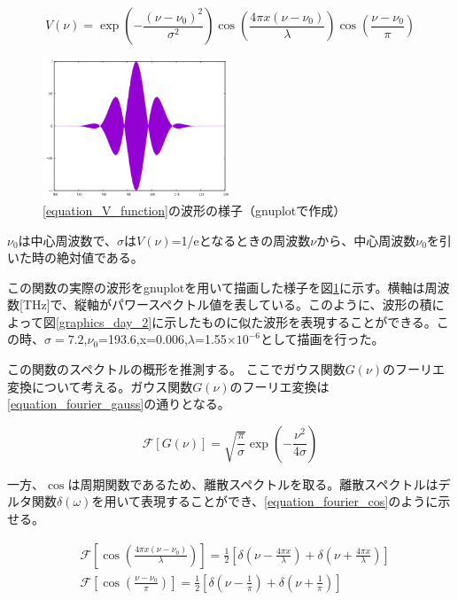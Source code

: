 \documentclass[uplatex, titlepage, fontsize=10pt, paper=a4paper]{jsarticle}
\numberwithin{equation}{section}
\begin{document}
\begin{equation}
    V(\nu)=\exp\left(-\frac{(\nu-\nu_{0})^2}{\sigma^2}\right) \cos\left(\frac{4{\pi}x{(\nu-\nu_{0})}}{\lambda}\right)\cos\left(\frac{\nu-\nu_{0}}{\pi}\right)
    \label{equation_V_function}
\end{equation}

\begin{figure}
    \includegraphics[width = 0.5\textwidth]{画像フォルダ/spector_sample.png}
    \caption{\eqref{equation_V_function}の波形の様子（gnuplotで作成）}
    \label{function_V_sample_wave}
\end{figure}

$\nu_{0}$は中心周波数で、$\sigma$は$V(\nu)$=1/eとなるときの周波数$\nu$から、中心周波数$\nu_0$を引いた時の絶対値である。

この関数の実際の波形をgnuplotを用いて描画した様子を図\ref{function_V_sample_wave}に示す。横軸は周波数[THz]で、縦軸がパワースペクトル値を表している。このように、波形の積によって図\ref{graphics_day_2}に示したものに似た波形を表現することができる。この時、$\sigma=7.2$,$\nu_{0}$=193.6,x=0.006,$\lambda$=1.55$\times 10^{-6}$として描画を行った。

この関数のスペクトルの概形を推測する。
ここでガウス関数$G(\nu)$のフーリエ変換について考える。ガウス関数$G(\nu)$のフーリエ変換は\eqref{equation_fourier_gauss}の通りとなる。

\begin{equation}
    \mathcal{F}\left[ G(\nu) \right] = \sqrt{\frac{\pi}{\sigma}}\exp\left({-\frac{\nu^2}{4\sigma}}\right)
    \label{equation_fourier_gauss}
\end{equation}

一方、$\cos$は周期関数であるため、離散スペクトルを取る。離散スペクトルはデルタ関数$\delta(\omega)$を用いて表現することができ、\eqref{equation_fourier_cos}のように示せる。\cite{tusin_housiki}

\begin{equation}
    \begin{split}
    &\mathcal{F}\left[\cos\left(\frac{4{\pi}x({\nu-\nu_0})}{\lambda}\right)\right] = \frac{1}{2}\left[\delta\left(\nu-\frac{4{\pi}x}{\lambda}\right)+\delta\left(\nu+\frac{4{\pi}x}{\lambda}\right)\right] \\
    &\mathcal{F}\left[\cos\left(\frac{\nu-\nu_0}{\pi}\right)\right]=\frac{1}{2}\left[\delta\left(\nu-\frac{1}{\pi}\right)+\delta\left(\nu+\frac{1}{\pi}\right)\right]
    \end{split}
    \label{equation_fourier_cos}
\end{equation}
\end{document}

